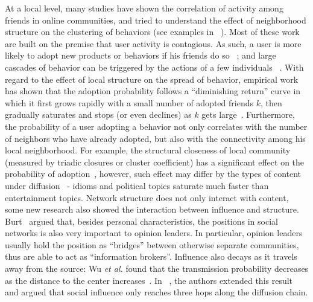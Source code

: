 \documentclass[phd,tocprelim]{cornell}
\begin{document}
At a local level, many studies have shown the correlation of activity among friends in online communities, and tried to understand the effect of neighborhood structure on the clustering of behaviors (see examples in
~\cite{Anagnostopoulos-2008,Backstrom:2006,Crandall:2008,Marlow:2006,Romero-2011}). Most of these work are built on the premise that user
activity is contagious. As such, a user is more likely to adopt new
products or behaviors if his friends do so ~\cite{Backstrom:2006,Leskovec:2007};
and large cascades of behavior can be triggered by the actions of a few
individuals ~\cite{Gladwell:2002,Rogers:2003}.  With regard to the effect
of local structure on the spread of behavior, 
empirical work has shown that the adoption probability follows a ``diminishing return'' curve in which it first grows rapidly with a small number of adopted friends $k$, then gradually saturates and stops (or even declines) as $k$ gets large~\cite{Backstrom:2006,Romero-2011}. Furthermore, the probability of a user adopting a behavior not only correlates with the number of neighbors who have already adopted, but also with the connectivity among his local neighborhood. For example, the structural closeness of local community (measured by triadic closures or cluster coefficient) has a significant effect on the probability of adoption~\cite{Backstrom:2006,Romero-2011}, however, such effect may differ by the types of content under diffusion~\cite{Romero-2011} - idioms and political topics saturate much faster than entertainment topics. Network structure does not only interact with content, some new research also showed the interaction between influence and structure. Burt~\cite{burt-1999} argued that, besides personal characteristics, the positions in social networks is also very important to opinion leaders. In particular, opinion leaders usually hold the position as ``bridges'' between otherwise separate communities, thus are able to act as ``information brokers''. Influence also decays as it travels away from the source: Wu \emph{et al.} found that the transmission probability decreases as the distance to the center increases~\cite{wu-2004}. In ~\cite{Christakis-2007,Christakis-2008,Fowler-2008}, the authors extended this result and argued that social influence only reaches three hops along the diffusion chain. 
\end{document}
